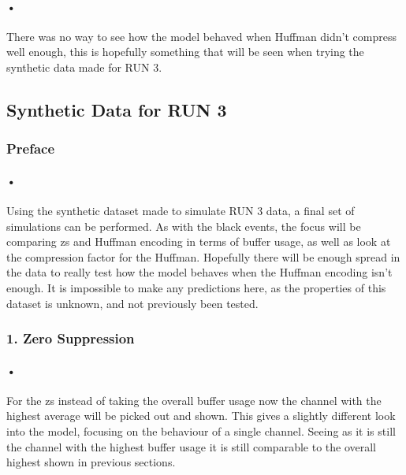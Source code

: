 \documentclass[a4paper, 12pt]{report}\dfrac{\right }{•}
\begin{document}
\paragraph{•}
There was no way to see how the model behaved when Huffman didn't compress well enough, this is hopefully something that will be seen when trying the synthetic data made for RUN 3.


\subsection{Synthetic Data for RUN 3}

\subsubsection{Preface}
\paragraph{•}
Using the synthetic dataset made to simulate RUN 3 data, a final set of simulations can be performed.
As with the black events, the focus will be comparing \gls{zs} and Huffman encoding in terms of buffer usage, as well as look at the compression factor for the Huffman.
Hopefully there will be enough spread in the data to really test how the model behaves when the Huffman encoding isn't enough.
It is impossible to make any predictions here, as the properties of this dataset is unknown, and not previously been tested.

\subsubsection{1. Zero Suppression}

\paragraph{•}
For the \gls{zs} instead of taking the overall buffer usage now the channel with the highest average will be picked out and shown.
This gives a slightly different look into the model, focusing on the behaviour of a single channel.
Seeing as it is still the channel with the highest buffer usage it is still comparable to the overall highest shown in previous sections. 
\end{document}
